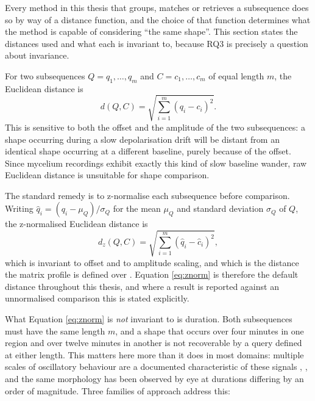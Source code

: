 Every method in this thesis that groups, matches or retrieves a subsequence does so by way of a distance function, and the choice of that function determines what the method is capable of considering ``the same shape''. This section states the distances used and what each is invariant to, because RQ3 is precisely a question about invariance.

For two subsequences $Q = q_1,\ldots,q_m$ and $C = c_1,\ldots,c_m$ of equal length $m$, the Euclidean distance is
\begin{equation}
d(Q,C) = \sqrt{\sum_{i=1}^{m}(q_i - c_i)^2}.
\end{equation}
This is sensitive to both the offset and the amplitude of the two subsequences: a shape occurring during a slow depolarisation drift will be distant from an identical shape occurring at a different baseline, purely because of the offset. Since mycelium recordings exhibit exactly this kind of slow baseline wander, raw Euclidean distance is unsuitable for shape comparison.

The standard remedy is to z-normalise each subsequence before comparison. Writing $\hat{q}_i = (q_i - \mu_Q)/\sigma_Q$ for the mean $\mu_Q$ and standard deviation $\sigma_Q$ of $Q$, the z-normalised Euclidean distance is
\begin{equation}
d_z(Q,C) = \sqrt{\sum_{i=1}^{m}(\hat{q}_i - \hat{c}_i)^2},
\label{eq:znorm}
\end{equation}
which is invariant to offset and to amplitude scaling, and which is the distance the matrix profile is defined over \cite{yeh}. Equation \eqref{eq:znorm} is therefore the default distance throughout this thesis, and where a result is reported against an unnormalised comparison this is stated explicitly.

What Equation \eqref{eq:znorm} is \emph{not} invariant to is duration. Both subsequences must have the same length $m$, and a shape that occurs over four minutes in one region and over twelve minutes in another is not recoverable by a query defined at either length. This matters here more than it does in most domains: multiple scales of oscillatory behaviour are a documented characteristic of these signals \cite{adamatzky2023}, \cite{dehshibi}, and the same morphology has been observed by eye at durations differing by an order of magnitude. Three families of approach address this:

